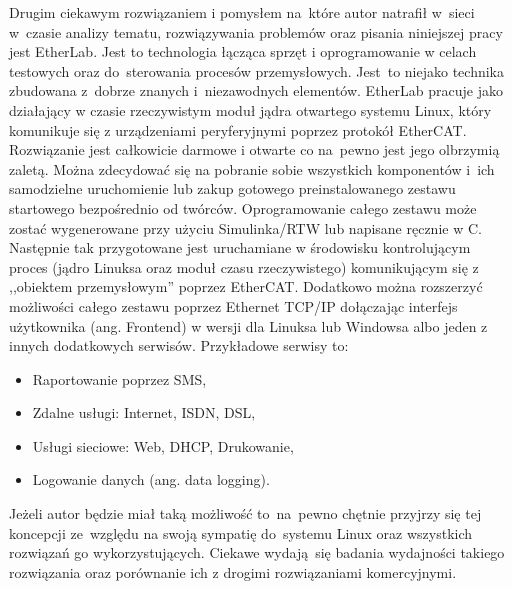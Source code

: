 Drugim ciekawym rozwiązaniem i pomysłem na~które autor natrafił w~sieci w~czasie analizy tematu, rozwiązywania problemów oraz pisania niniejszej pracy jest EtherLab. Jest to technologia łącząca sprzęt i oprogramowanie w celach testowych oraz do~sterowania procesów przemysłowych. Jest~to niejako technika zbudowana z~dobrze znanych i~niezawodnych elementów.
EtherLab pracuje jako działający w czasie rzeczywistym moduł jądra otwartego systemu Linux, który komunikuje się z urządzeniami peryferyjnymi poprzez protokół EtherCAT. Rozwiązanie jest całkowicie darmowe i otwarte co na~pewno jest jego olbrzymią zaletą. Można zdecydować się na pobranie sobie wszystkich komponentów i~ich samodzielne uruchomienie lub zakup gotowego preinstalowanego zestawu startowego bezpośrednio od twórców. 
Oprogramowanie całego zestawu może zostać wygenerowane przy użyciu Simulinka/RTW lub napisane ręcznie w C. Następnie tak przygotowane jest uruchamiane w środowisku kontrolującym proces (jądro Linuksa oraz moduł czasu rzeczywistego) komunikującym się z ,,obiektem przemysłowym'' poprzez EtherCAT. Dodatkowo można rozszerzyć możliwości całego zestawu poprzez Ethernet TCP/IP dołączając interfejs użytkownika (ang. Frontend) w wersji dla Linuksa lub Windowsa albo jeden z innych dodatkowych serwisów. Przykładowe serwisy to:
\begin{itemize}
\item Raportowanie poprzez SMS,
\item Zdalne usługi: Internet, ISDN, DSL,
\item Usługi sieciowe: Web, DHCP, Drukowanie,
\item Logowanie danych (ang. data logging).
\end{itemize}
Jeżeli autor będzie miał taką możliwość to~na~pewno chętnie przyjrzy się tej koncepcji ze~względu na swoją sympatię do~systemu Linux oraz wszystkich rozwiązań go wykorzystujących. Ciekawe wydają~się badania wydajności takiego rozwiązania oraz porównanie ich z drogimi rozwiązaniami komercyjnymi.
